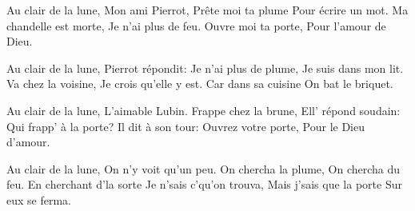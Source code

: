 \beginverse
Au clair de la lune,
Mon ami Pierrot,
Pr\^ete moi ta plume
Pour \'ecrire un mot.
Ma chandelle est morte,
Je n'ai plus de feu.
Ouvre moi ta porte,
Pour l'amour de Dieu.
\endverse

\beginverse
Au clair de la lune,
Pierrot r\'epondit:
Je n'ai plus de plume,
Je suis dans mon lit.
Va chez la voisine,
Je crois qu'elle y est.
Car dans sa cuisine
On bat le briquet.
\endverse

\beginverse
Au clair de la lune,
L'aimable Lubin.
Frappe chez la brune,
Ell' r\'epond soudain:
Qui frapp' à la porte?
Il dit à son tour:
Ouvrez votre porte,
Pour le Dieu d'amour.
\endverse

\beginverse
Au clair de la lune,
On n'y voit qu'un peu.
On chercha la plume,
On chercha du feu.
En cherchant d'la sorte
Je n'sais c'qu'on trouva,
Mais j'sais que la porte
Sur eux se ferma.
\endverse

\endsong